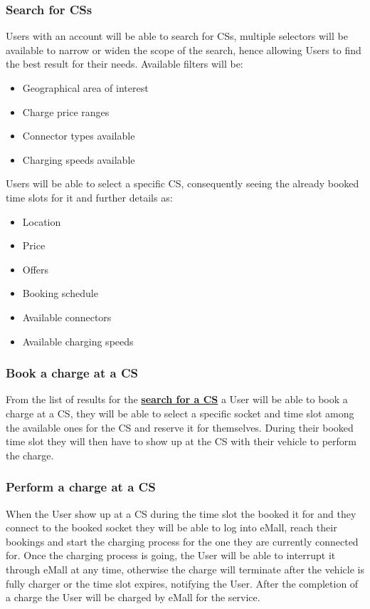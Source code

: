 \documentclass[11pt]{article}
\begin{document}
\subsubsection{Search for CSs}
\label{subsubsection:searchForCS}

Users with an account will be able to search for CSs, multiple selectors will be available to narrow or widen the scope of the search, hence allowing Users to find the best result for their needs. Available filters will be:
\begin{itemize}
    \item Geographical area of interest
    \item Charge price ranges
    \item Connector types available
    \item Charging speeds available
\end{itemize}
Users will be able to select a specific CS, consequently seeing the already booked time slots for it and further details as:
\begin{itemize}
    \item Location
    \item Price
    \item Offers
    \item Booking schedule
    \item Available connectors
    \item Available charging speeds
\end{itemize}

\subsubsection{Book a charge at a CS}

From the list of results for the \hyperref[subsubsection:searchForCS]{\textbf{search for a CS}} a User will be able to book a charge at a CS, they will be able to select a specific socket and time slot among the available ones for the CS and reserve it for themselves. During their booked time slot they will then have to show up at the CS with their vehicle to perform the charge.

\subsubsection{Perform a charge at a CS}

When the User show up at a CS during the time slot the booked it for and they connect to the booked socket they will be able to log into eMall, reach their bookings and start the charging process for the one they are currently connected for. Once the charging process is going, the User will be able to interrupt it through eMall at any time, otherwise the charge will terminate after the vehicle is fully charger or the time slot expires, notifying the User. After the completion of a charge the User will be charged by eMall for the service.
\end{document}
